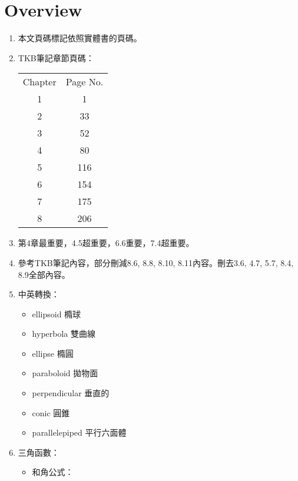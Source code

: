 \section{Overview}

\begin{enumerate}
    \item 本文頁碼標記依照實體書\cite{1}\cite{2}\cite{3}的頁碼。
    \item TKB筆記\cite{4}章節頁碼：
    \begin{table}[H]
        \centering
        \begin{tabular}{|c|c|}
            \hline
            Chapter & Page No. \\
            \Xhline{2\arrayrulewidth}
            1 & 1 \\
            \hline
            2 & 33 \\
            \hline
            3 & 52 \\
            \hline
            4 & 80 \\
            \hline
            5 & 116 \\
            \hline
            6 & 154 \\
            \hline
            7 & 175 \\
            \hline
            8 & 206 \\
            \hline
        \end{tabular}
    \end{table}
    \item 第4章最重要，4.5超重要，6.6重要，7.4超重要。
    \item 參考TKB筆記\cite{4}內容，部分刪減8.6, 8.8, 8.10, 8.11內容。刪去3.6, 4.7, 5.7, 8.4, 8.9全部內容。
    \item 中英轉換：
    \begin{itemize}
        \item ellipsoid 橢球
        \item hyperbola 雙曲線
        \item ellipse 橢圓
        \item paraboloid 拋物面
        \item perpendicular 垂直的
        \item conic 圓錐
        \item parallelepiped 平行六面體
    \end{itemize}
    \item 三角函數：
    \begin{itemize}
        \item 和角公式： \begin{subequations}

\end{subequations}
\end{itemize}
\end{enumerate}
